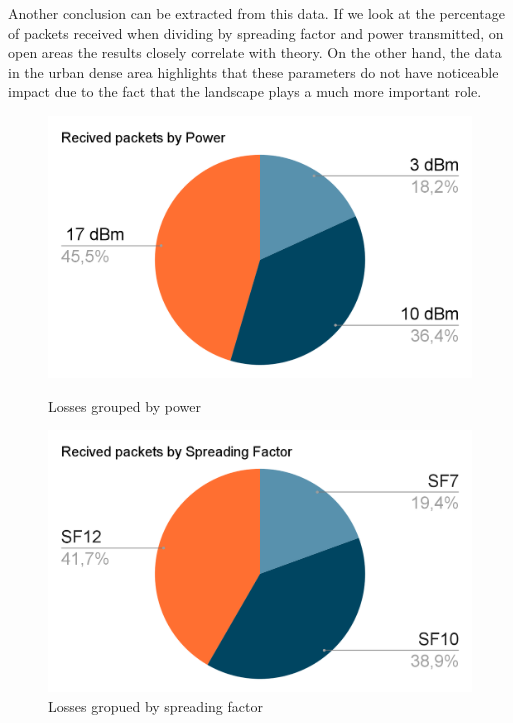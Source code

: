 Another conclusion can be extracted from this data. If we look at the percentage of packets received when dividing by spreading factor and power
transmitted, on open areas the results closely correlate with theory. On the other hand, the data in the urban dense area highlights that 
these parameters do not have noticeable impact due to the fact that the landscape plays a much more important role.

\begin{figure}[!h]
\centering    
\includegraphics[width=\linewidth]{recivedByPower.png}
\caption{Losses grouped by power}
\label{conc:recivedPow}

\includegraphics[width=\linewidth]{recivedBySpreading.png}
\caption{Losses gropued by spreading factor}
\label{conc:recivedSp}
\end{figure}
